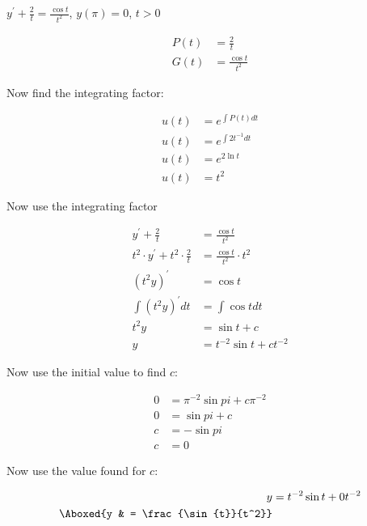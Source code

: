 \documentclass{lapchomework}
\begin{document}
\begin{problems}
\begin{solution}
\end{solution}

\pagebreak

\problem [11] $y^{\prime}+\frac{2}{t}=\frac{\cos{t}}{t^2}$, $y(\pi)=0$, $t > 0$

\begin{solution}

\step \begin{align*}
P(t) & = \frac{2}{t} \\
G(t) & = \frac{\cos{t}}{t^2}
\end{align*}

\step Now find the integrating factor:

\step \begin{align*}
u(t) & = e^{\int P(t) dt} \\
u(t) & = e^{\int 2t^{-1} dt} \\
u(t) & = e^{2\ln{t}} \\
u(t) & = t^2
\end{align*}

\step Now use the integrating factor

\step \begin{align*}
y^{\prime}+\frac{2}{t} & = \frac{\cos{t}}{t^2} \\
t^2 \cdot y^{\prime} + t^2 \cdot \frac{2}{t} & = \frac{\cos{t}}{t^2} \cdot t^2 \\
\left(t^2y\right)^{\prime} & = \cos{t} \\
\int \left(t^2y\right)^{\prime} dt & = \int \cos{t} dt \\
t^2y & = \sin{t} + c \\
y & =t^{-2}\sin{t} + ct^{-2}
\end{align*}

\step Now use the initial value to find $c$:

\step \begin{align*}
0 & = \pi^{-2}\sin{pi} + c\pi^{-2} \\
0 & = \sin{pi} + c \\
c & = -\sin{pi} \\
c & = 0
\end{align*}

\step Now use the value found for $c$:

\step \begin{align*}
y & = t^{-2}\sin{t} + 0t^{-2} \\
\Aboxed{y & = \frac{\sin{t}}{t^2}}
\end{align*}

\end{solution}


\end{problems}
\end{document}
